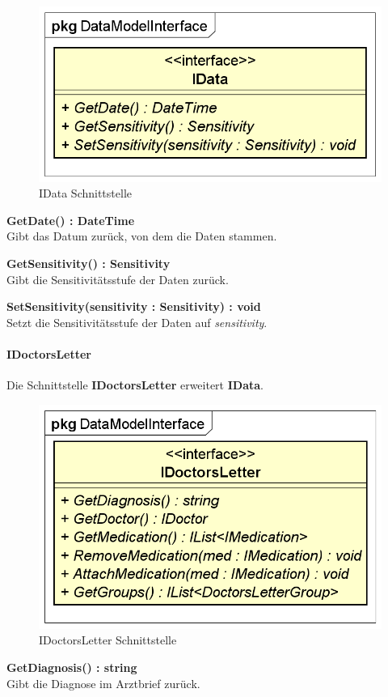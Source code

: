 \documentclass[a4paper]{scrreprt}
\begin{document}
\begin{figure}[H]
\centering
\includegraphics[width=0.45\textheight]{graphics/Klassendiagramme/Model/IData.png}
\caption{IData Schnittstelle}
\end{figure}
\textbf{GetDate() : DateTime}\\
Gibt das Datum zurück, von dem die Daten stammen.

\textbf{GetSensitivity() : Sensitivity}\\
Gibt die Sensitivitätsstufe der Daten zurück.

\textbf{SetSensitivity(sensitivity : Sensitivity) : void}\\
Setzt die Sensitivitätsstufe der Daten auf \textit{sensitivity}.

\paragraph{IDoctorsLetter}
Die Schnittstelle \textbf{IDoctorsLetter} erweitert \textbf{IData}.

\begin{figure}[H]
\centering
\includegraphics[width=0.55\textheight]{graphics/Klassendiagramme/Model/IDoctorsLetter.png}
\caption{IDoctorsLetter Schnittstelle}
\end{figure}
\textbf{GetDiagnosis() : string}\\
Gibt die Diagnose im Arztbrief zurück.
\end{document}

